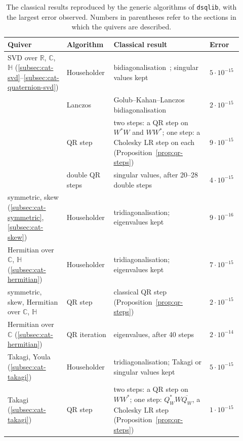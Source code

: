 \documentclass[12pt, a4paper]{report}
\theoremstyle{plain}
\theoremstyle{definition}
\theoremstyle{remark}
\theoremstyle{plain}
\newcommand{\RR}{\mathbb{R}}
\newcommand{\CC}{\mathbb{C}}
\newcommand{\HH}{\mathbb{H}}
\newcommand{\rowrule}{\arrayrulecolor{black!30}\midrule[0.3pt]\arrayrulecolor{black}}
\begin{document}
\begin{table}[htbp]
\centering
\caption{The classical results reproduced by the generic algorithms of \texttt{dsqlib}, with the largest error observed. Numbers in parentheses refer to the sections in which the quivers are described.}
\label{tab:experiments}
\small
\renewcommand{\arraystretch}{1.25}
\begin{tabular}{@{}>{\raggedright\arraybackslash}p{0.24\linewidth}>{\raggedright\arraybackslash}p{0.16\linewidth}>{\raggedright\arraybackslash}p{0.39\linewidth}>{\raggedright\arraybackslash}p{0.13\linewidth}@{}}
\toprule
\textbf{Quiver} & \textbf{Algorithm} & \textbf{Classical result} & \textbf{Error} \\
\midrule
SVD over $\RR$, $\CC$, $\HH$ (\ref{subsec:cat-svd}--\ref{subsec:cat-quaternion-svd}) & Householder & bidiagonalisation~\cite{GolubKahan1965}; singular values kept & $5\cdot10^{-15}$ \\ \addlinespace[3pt]
 & Lanczos & \mbox{Golub--Kahan--Lanczos} bidiagonalisation & $2\cdot10^{-15}$ \\ \addlinespace[3pt]
 & QR step & two steps: a QR step on $W^*W$ and $WW^*$; one step: a Cholesky LR step on each (Proposition~\ref{prop:qr-steps}) & $9\cdot10^{-15}$ \\ \addlinespace[3pt]
 & double QR steps & singular values, after 20--28 double steps & $4\cdot10^{-15}$ \\
\rowrule
symmetric, skew (\ref{subsec:cat-symmetric}, \ref{subsec:cat-skew}) & Householder & tridiagonalisation; eigenvalues kept & $9\cdot10^{-16}$ \\ \addlinespace[3pt]
Hermitian over $\CC$, $\HH$ (\ref{subsec:cat-hermitian}) & Householder & tridiagonalisation; eigenvalues kept & $7\cdot10^{-15}$ \\ \addlinespace[3pt]
symmetric, skew, Hermitian over $\CC$, $\HH$ & QR step & classical QR step (Proposition~\ref{prop:qr-steps}) & $2\cdot10^{-15}$ \\ \addlinespace[3pt]
Hermitian over $\CC$ (\ref{subsec:cat-hermitian}) & QR iteration & eigenvalues, after 40 steps & $2\cdot10^{-14}$ \\
\rowrule
Takagi, Youla (\ref{subsec:cat-takagi}) & Householder & tridiagonalisation; Takagi or singular values kept & $5\cdot10^{-15}$ \\ \addlinespace[3pt]
Takagi (\ref{subsec:cat-takagi}) & QR step & two steps: a QR step on $WW^*$; one step: $Q_W^*W\overline{Q_W}$, a Cholesky LR step (Proposition~\ref{prop:qr-steps}) & $1\cdot10^{-15}$ \\

\end{tabular}
\end{table}
\end{document}
